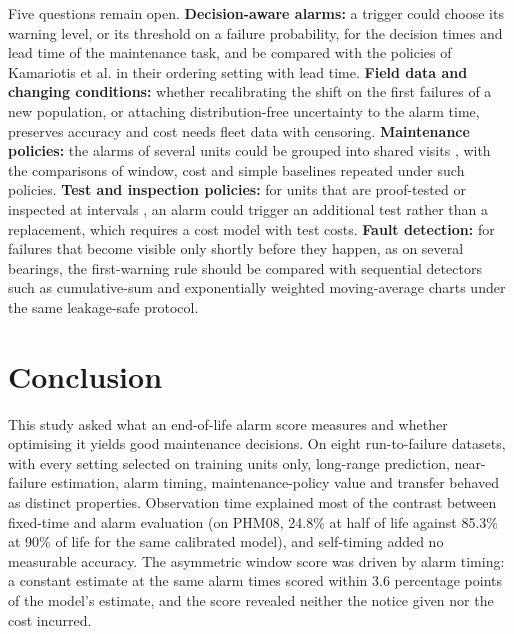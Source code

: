 \documentclass[a4paper,fleqn,doubleblind]{cas-dc}
\begin{document}
Five questions remain open. \textbf{Decision-aware alarms:} a trigger could choose its warning level, or its threshold on a failure probability, for the decision times and lead time of the maintenance task, and be compared with the policies of Kamariotis et al. \cite{kamariotis2024} in their ordering setting with lead time. \textbf{Field data and changing conditions:} whether recalibrating the shift on the first failures of a new population, or attaching distribution-free uncertainty to the alarm time, preserves accuracy and cost needs fleet data with censoring. \textbf{Maintenance policies:} the alarms of several units could be grouped into shared visits \cite{depater2022,mitici2023}, with the comparisons of window, cost and simple baselines repeated under such policies. \textbf{Test and inspection policies:} for units that are proof-tested or inspected at intervals \cite{dejonge2020}, an alarm could trigger an additional test rather than a replacement, which requires a cost model with test costs. \textbf{Fault detection:} for failures that become visible only shortly before they happen, as on several bearings, the first-warning rule should be compared with sequential detectors such as cumulative-sum and exponentially weighted moving-average charts \cite{page1954,roberts1959} under the same leakage-safe protocol.

\section{Conclusion}\label{sec:10}

This study asked what an end-of-life alarm score measures and whether optimising it yields good maintenance decisions. On eight run-to-failure datasets, with every setting selected on training units only, long-range prediction, near-failure estimation, alarm timing, maintenance-policy value and transfer behaved as distinct properties. Observation time explained most of the contrast between fixed-time and alarm evaluation (on PHM08, 24.8\% at half of life against 85.3\% at 90\% of life for the same calibrated model), and self-timing added no measurable accuracy. The asymmetric window score was driven by alarm timing: a constant estimate at the same alarm times scored within 3.6 percentage points of the model's estimate, and the score revealed neither the notice given nor the cost incurred.
\end{document}
